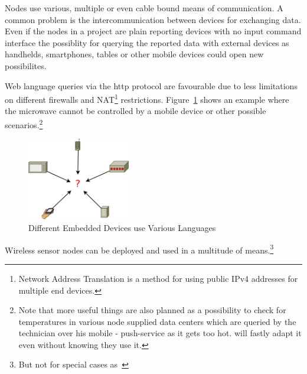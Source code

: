 Nodes use various, multiple or even cable bound means of communication. A common problem is the intercommunication between devices for 
exchanging data. Even if the nodes in a project are plain reporting devices with no input command interface the possiblity for
querying the reported data with external devices as handhelds, smartphones, tables or other mobile devices could open new possibilites.

Web language queries via the http protocol are favourable due to less limitations on different firewalls and NAT\footnote{Network Address Translation is a
method for using public IPv4 addresses for multiple end devices.}  restrictions. Figure~\ref{fig:problem} shows an example where the microwave cannot
be controlled by a mobile device or other possible scenarios.\footnote{Note that more useful things are also planned as a possibility to check for 
temperatures in various node supplied data centers which are queried by the technician over his mobile - push-service as it gets too hot.
 will fastly adapt it even without knowing they use it.}

\begin{figure}[h]
   \centering
   \includegraphics[width=0.4\textwidth]{pic/problem.png}%
   \caption{Different Embedded Devices use Various Languages}
   \label{fig:problem}%
\end{figure}


Wireless sensor nodes can be deployed and used in a multitude of means.\footnote{But not for special cases as~\cite{biederbeck}}
